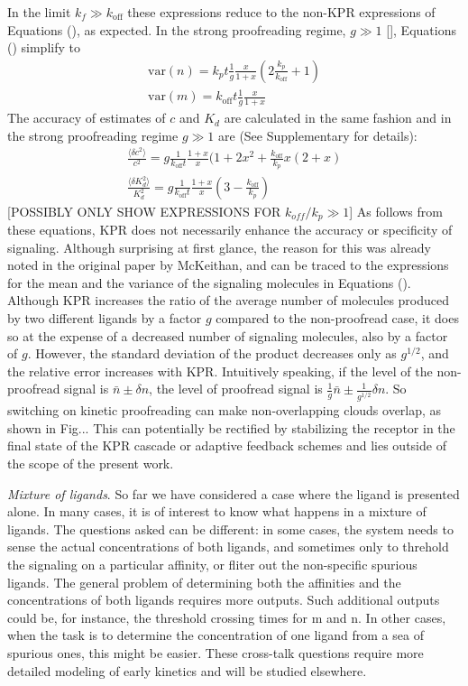 \documentclass[prl,showpacs]{revtex4}
\begin{document}
In the limit $k_f\gg k_{\text{off}}$ these expressions reduce to the non-KPR expressions of Equations (), as expected. In the strong proofreading regime, $g\gg 1$ [], Equations () simplify to
%
\begin{eqnarray}
\text{var}(n)=k_pt\frac{1}{g}\frac{x}{1+x}(2\frac{k_p}{k_{\text{off}}}+1)\\
\text{var}(m)=k_{\text{off}}t\frac{1}{g}\frac{x}{1+x}
\end{eqnarray}
%
The accuracy of estimates of $c$ and $K_d$ are calculated in the same fashion and in the strong proofreading regime $g\gg 1$ are (See Supplementary for details):
%
\begin{eqnarray}
\frac{\langle\delta c^2\rangle}{c^2}=g\frac{1}{k_{\text{off}}t}\frac{1+x}{x}(1+2x^2+\frac{k_{\text{off}}}{k_p}x(2+x)\\
\frac{\langle\delta K_d^2\rangle}{K_d^2}=g\frac{1}{k_{\text{off}}t}\frac{1+x}{x}(3-\frac{k_{\text{off}}}{k_p})
\end{eqnarray}
%
[POSSIBLY ONLY SHOW EXPRESSIONS FOR $k_{off}/k_p\gg 1$]
As follows from these equations, KPR does not necessarily enhance the accuracy or specificity of signaling.  Although surprising at first glance, the reason for this was already noted in the original paper by McKeithan, and can be traced to the expressions for the mean and the variance of the signaling molecules in Equations (). Although KPR increases the ratio of the average number of molecules produced by two different ligands by a factor $g$ compared to the non-proofread case, it does so at the expense of a decreased number of signaling molecules, also by a factor of $g$. However, the standard deviation of the product decreases only as $g^{1/2}$, and the relative error increases with KPR. Intuitively speaking, if the level of the non-proofread signal is $\bar{n}\pm\delta n$, the level of proofread signal is $\frac{1}{g}\bar{n}\pm\frac{1}{g^{1/2}}\delta n$. So switching on kinetic proofreading can make non-overlapping clouds overlap, as shown in Fig...
This can potentially be rectified by stabilizing the receptor in the final state of the KPR cascade \cite{McKeithan-KPR-1995} or adaptive feedback schemes %
 and lies outside of the scope of the present work.

\emph{Mixture of ligands}. So far we have considered a case where the ligand is presented alone. In many cases, it is of interest to know what happens in a mixture of ligands. The questions asked can be different: in some cases, the system needs to sense the actual concentrations of both ligands, and sometimes only to threhold the signaling on a particular affinity, or fliter out the non-specific spurious ligands. The general problem of determining both the affinities and the concentrations of both ligands requires more outputs. Such additional outputs could be, for instance, the threshold crossing times for m and n. In other cases, when the task is to determine the concentration of one ligand  from a sea of spurious ones, this might be easier. These cross-talk questions require more detailed modeling of early kinetics and will be studied elsewhere.
\end{document}

